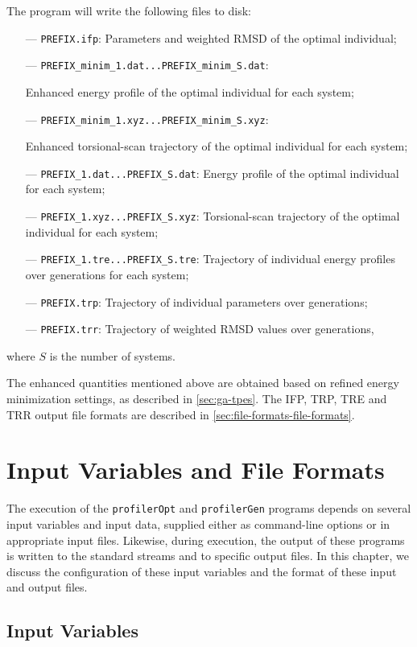 \documentclass[10pt,a4paper]{report}
\numberwithin{equation}{section}
\newcommand{\profileropt}[0]{\texttt{profilerOpt}}
\newcommand{\profilergen}[0]{\texttt{profilerGen}}
\begin{document}
The program will write the following files to disk:
\begin{itemize}
\item [---]\texttt{PREFIX.ifp}: Parameters and weighted RMSD of the optimal individual;
\item[---] \texttt{PREFIX\_minim\_1.dat...PREFIX\_minim\_S.dat}: \par Enhanced energy profile of the optimal individual for each system;
\item[---] \texttt{PREFIX\_minim\_1.xyz...PREFIX\_minim\_S.xyz}: \par Enhanced torsional-scan trajectory of the optimal individual for each system;
\item[---] \texttt{PREFIX\_1.dat...PREFIX\_S.dat}: Energy profile of the optimal individual for each system;
\item[---] \texttt{PREFIX\_1.xyz...PREFIX\_S.xyz}: Torsional-scan trajectory of the optimal individual for each system;
\item [---]\texttt{PREFIX\_1.tre...PREFIX\_S.tre}: Trajectory of individual energy profiles over generations for each system;
\item [---]\texttt{PREFIX.trp}: Trajectory of individual parameters over generations;
\item [---]\texttt{PREFIX.trr}: Trajectory of weighted RMSD values over generations,
\end{itemize}
where $S$ is the number of systems.

The enhanced quantities mentioned above are obtained based on refined
energy minimization settings, as described in \autoref{sec:ga-tpes}.
The IFP, TRP, TRE and TRR output file formats are described in
\autoref{sec:file-formats-file-formats}.

\chapter{Input Variables and File Formats}
\label{chap:file-formats}

The execution of the \profileropt{} and \profilergen{} programs
depends on several input variables and input data, supplied either as
command-line options or in appropriate input files.  Likewise, during
execution, the output of these programs is written to the standard
streams and to specific output files. In this chapter, we discuss the
configuration of these input variables and the format of these input
and output files.

\section{Input Variables}
\label{sec:file-formats-input-variables}
\end{document}
